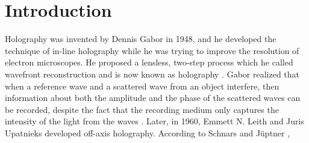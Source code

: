 %
%

\chapter{Introduction} \label{chap:Intro}

Holography was invented by Dennis Gabor in 1948, and he developed the technique
of in-line holography while he was trying to improve the resolution of
electron microscopes. He proposed a lensless, two-step process which he called
wavefront reconstruction and is now known as holography .
Gabor realized that when a reference wave and a scattered wave from an object
interfere, then information about both the amplitude and the phase of the
scattered waves can be recorded, despite the fact that the recording medium
only captures the intensity of the light from the waves \cite{Goodman}.
Later, in 1960, Emmett N. Leith and Juris Upatnieks developed
off-axis holography. According to Schnars and J\"{u}ptner
\cite{schnars_digital_2002},

